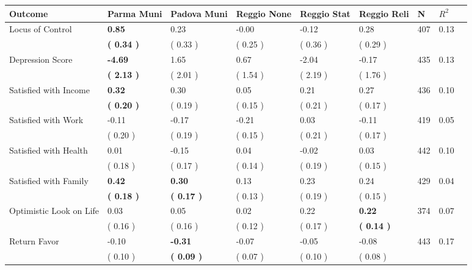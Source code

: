 \begin{tabular}{L{6.2cm} C{1.8cm} C{1.8cm} C{1.8cm} C{1.8cm} C{1.8cm} C{1.8cm} C{0.3cm} C{0.3cm}}
\toprule
 \textbf{Outcome} & \textbf{Parma Muni} & \textbf{Padova Muni} & \textbf{Reggio None} & \textbf{Reggio Stat} & \textbf{Reggio Reli} & \textbf{N} & \textbf{$ R^2$} \\
\midrule
Locus of Control & \textbf{     0.85} &      0.23 &     -0.00 &     -0.12 &      0.28  & 407 &       0.13 \\ 
 & \textbf{(     0.34 )} & (     0.33 ) & (     0.25 ) & (     0.36 ) & (     0.29 )  & \\
Depression Score & \textbf{    -4.69} &      1.65 &      0.67 &     -2.04 &     -0.17  & 435 &       0.13 \\ 
 & \textbf{(     2.13 )} & (     2.01 ) & (     1.54 ) & (     2.19 ) & (     1.76 )  & \\
Satisfied with Income & \textbf{     0.32} &      0.30 &      0.05 &      0.21 &      0.27  & 436 &       0.10 \\ 
 & \textbf{(     0.20 )} & (     0.19 ) & (     0.15 ) & (     0.21 ) & (     0.17 )  & \\
Satisfied with Work &     -0.11 &     -0.17 &     -0.21 &      0.03 &     -0.11  & 419 &       0.05 \\ 
 & (     0.20 ) & (     0.19 ) & (     0.15 ) & (     0.21 ) & (     0.17 )  & \\
Satisfied with Health &      0.01 &     -0.15 &      0.04 &     -0.02 &      0.03  & 442 &       0.10 \\ 
 & (     0.18 ) & (     0.17 ) & (     0.14 ) & (     0.19 ) & (     0.15 )  & \\
Satisfied with Family & \textbf{     0.42} & \textbf{     0.30} &      0.13 &      0.23 &      0.24  & 429 &       0.04 \\ 
 & \textbf{(     0.18 )} & \textbf{(     0.17 )} & (     0.13 ) & (     0.19 ) & (     0.15 )  & \\
Optimistic Look on Life &      0.03 &      0.05 &      0.02 &      0.22 & \textbf{     0.22}  & 374 &       0.07 \\ 
 & (     0.16 ) & (     0.16 ) & (     0.12 ) & (     0.17 ) & \textbf{(     0.14 )}  & \\
Return Favor &     -0.10 & \textbf{    -0.31} &     -0.07 &     -0.05 &     -0.08  & 443 &       0.17 \\ 
 & (     0.10 ) & \textbf{(     0.09 )} & (     0.07 ) & (     0.10 ) & (     0.08 )  & \\

\end{tabular}
